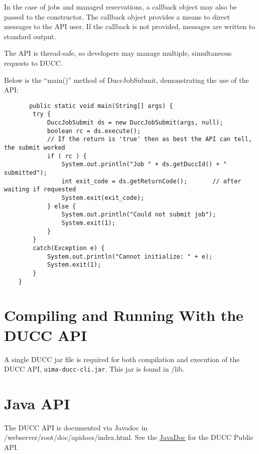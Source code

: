    In the case of jobs and managed reservations, a callback object may also be passed to
   the constructor.  The callback object provides a means to direct messages to the
   API user.  If the callback is not provided, messages are written to standard output.

   The API is thread-safe, so developers may manage multiple, simultaneous requests to
   DUCC.

   Below is the ``main()'' method of DuccJobSubmit, demonstrating the use of the API:
\begin{verbatim}   
       public static void main(String[] args) {
        try {
            DuccJobSubmit ds = new DuccJobSubmit(args, null);
            boolean rc = ds.execute();
            // If the return is 'true' then as best the API can tell, the submit worked
            if ( rc ) {                
                System.out.println("Job " + ds.getDuccId() + " submitted");
                int exit_code = ds.getReturnCode();       // after waiting if requested
                System.exit(exit_code);
            } else {
                System.out.println("Could not submit job");
                System.exit(1);
            }
        }
        catch(Exception e) {
            System.out.println("Cannot initialize: " + e);
            System.exit(1);
        }
    }
\end{verbatim}

\section{Compiling and Running With the DUCC API}

   A single DUCC jar file is required for both compilation and execution of the DUCC API,
   {\tt uima-ducc-cli.jar}.  This jar is found in \duccruntime/lib.

\section{Java API}
\ifpdf
   The DUCC API is documented via Javadoc in \ducchome/webserver/root/doc/apidocs/index.html.
\else
   See the \href{api/index.html}{JavaDoc} for the DUCC Public API.
\fi
